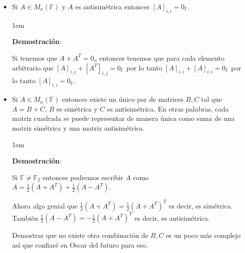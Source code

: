 \documentclass[12pt, fleqn]{report}                             %
\newenvironment{SmallIndentation}[1][0.75em]                    %
    {\begin{adjustwidth}{#1}{}\begin{footnotesize}}                 %
    {\end{footnotesize}\end{adjustwidth}}                           %
\begin{document}
                    \begin{itemize}

                        \item Si $A \in M_{n}(\mathbb{F})$ y $A$ es antisimétrica entonces 
                            $[A]_{i,i} = 0_{\mathbb{F}}$.

                            \begin{SmallIndentation}[1em]
                                \textbf{Demostración}:

                                Si tenemos que $A + A^T = 0_{n}$ entonces tenemos que para cada
                                elemento arbitrario que $[A]_{i,j} + [A^T]_{i,j} = 0_{\mathbb{F}}$
                                por lo tanto $[A]_{i,i} + [A]_{i,i} = 0_{\mathbb{F}}$ por lo tanto 
                                $[A]_{i,i} = 0_{\mathbb{F}}$.

                            \end{SmallIndentation}

                        \item Si $A \in M_{n}(\mathbb{F})$ entonces existe un único par de matrices $B,C$
                            tal que $A = B + C$, $B$ es simétrica y $C$ es antisimétrica. 
                            En otras palabras, cada matriz cuadrada se puede representar de manera única
                            como suma de una matriz simétrica y una matriz antisimétrica.

                            \begin{SmallIndentation}[1em]
                                \textbf{Demostración}:

                                Si $\mathbb{F} \neq \mathbb{F}_2$ entonces podremos escribir $A$ como
                                $A = \frac{1}{2}(A + A^T) + \frac{1}{2}(A - A^T)$.

                                Ahora algo genial que $\frac{1}{2}(A + A^T)=\frac{1}{2}(A + A^T)^T$ es
                                decir, es simétrica.
                                También $\frac{1}{2}(A - A^T)=-\frac{1}{2}(A + A^T)^T$ es decir, es
                                antisimétrica.

                                Demostrar que no existe otra combinación de $B,C$ es un poco más complejo
                                así que confiaré en Oscar del futuro para eso.


\end{SmallIndentation}
\end{itemize}
\end{document}

